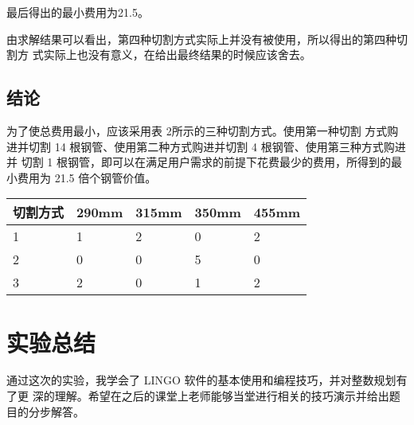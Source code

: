 \documentclass{article}
\begin{document}
最后得出的最小费用为21.5。

由求解结果可以看出，第四种切割方式实际上并没有被使用，所以得出的第四种切割方 式实际上也没有意义，在给出最终结果的时候应该舍去。

\subsection{结论}

为了使总费用最小，应该采用表 2所示的三种切割方式。使用第一种切割
方式购进并切割 14 根钢管、使用第二种方式购进并切割 4 根钢管、使用第三种方式购进并 切割 1 根钢管，即可以在满足用户需求的前提下花费最少的费用，所得到的最小费用为 21.5 倍个钢管价值。


\begin{table}[H]
\centering
\begin{tabular}{|l|l|l|l|l|}
\hline
切割方式 & 290mm & 315mm & 350mm & 455mm \\ \hline
1    & 1     & 2     & 0     & 2     \\ \hline
2    & 0     & 0     & 5     & 0     \\ \hline
3    & 2     & 0     & 1     & 2     \\ \hline

\end{tabular}
\end{table}

\section{实验总结}

通过这次的实验，我学会了 LINGO 软件的基本使用和编程技巧，并对整数规划有了更 深的理解。希望在之后的课堂上老师能够当堂进行相关的技巧演示并给出题目的分步解答。
\end{document}
